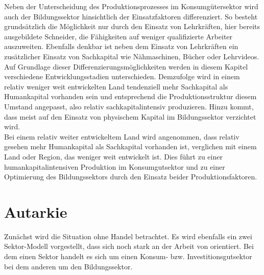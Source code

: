 Neben der Unterscheidung des Produktionsprozesses im Konsumgütersektor wird auch der Bildungssektor hinsichtlich der Einsatzfaktoren differenziert. So besteht grundsätzlich die Möglichkeit nur durch den Einsatz von Lehrkräften, hier bereits ausgebildete Schneider, die Fähigkeiten auf weniger qualifizierte Arbeiter auszuweiten. 
Ebenfalls denkbar ist neben dem Einsatz von Lehrkräften ein zusätzlicher Einsatz von Sachkapital wie Nähmaschinen, Bücher oder Lehrvideos.\\
Auf Grundlage dieser Differenzierungsmöglichkeiten werden in diesem Kapitel verschiedene Entwicklungsstadien unterschieden. Demzufolge wird in einem relativ weniger weit entwickelten Land tendenziell mehr Sachkapital als Humankapital vorhanden sein und entsprechend die Produktionsstruktur diesem Umstand angepasst, also relativ sachkapitalintensiv produzieren. Hinzu kommt, dass meist auf den Einsatz von physischem Kapital im Bildungssektor verzichtet wird.\\
Bei einem relativ weiter entwickeltem Land wird angenommen, dass relativ gesehen mehr Humankapital als Sachkapital vorhanden ist, verglichen mit einem Land oder Region, das weniger weit entwickelt ist. Dies führt zu einer humankapitalintensiven Produktion im Konsumgutsektor und zu einer Optimierung des Bildungssektors durch den Einsatz beider Produktionsfaktoren. 

\section{Autarkie}
Zunächst wird die Situation ohne Handel betrachtet. Es wird ebenfalls ein zwei Sektor-Modell vorgestellt, dass sich noch stark an der Arbeit von \citet{Lucas.1988} orientiert. Bei dem einen Sektor handelt es sich um einen Konsum- bzw. Investitionsgutsektor bei dem anderen um den Bildungssektor.
